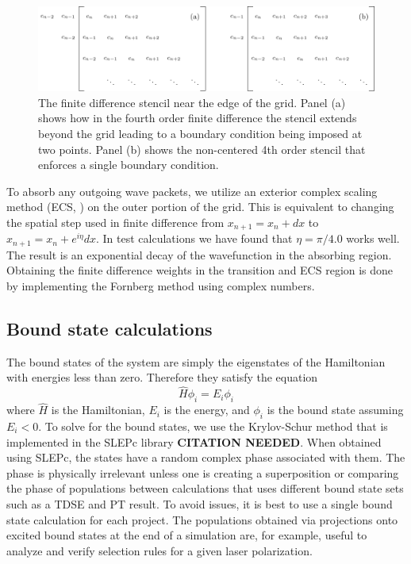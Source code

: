 \begin{figure}[t]
\centering
   
    \includegraphics[width=\linewidth]{figs/ghost_nodes.pdf}
   
\caption{The finite difference stencil near the edge of the grid. Panel (a) shows how in the fourth order finite difference the stencil extends beyond the grid leading to a boundary condition being imposed at two points. Panel (b) shows the non-centered 4th order stencil that enforces a single boundary condition.
} 
  \label{fig:ghost_nodes}
\end{figure}


To absorb any outgoing wave packets, we utilize an exterior complex scaling method (ECS, \cite{He2007}) on the outer portion of the grid. This is equivalent to changing the spatial step used in finite difference from $x_{n+1} = x_n+dx$ to $x_{n+1} = x_n+e^{i\eta}dx$. In test calculations we have found that $\eta=\pi / 4.0$ works well. The result is an exponential decay of the wavefunction in the absorbing region. Obtaining the finite difference weights in the transition and ECS region is done by implementing the Fornberg method \cite{Fornberg1988} using complex numbers.


\subsection{Bound state calculations} %
\label{sub:bound_state_calculations}
The bound states of the system are simply the eigenstates of the Hamiltonian with energies less than zero. Therefore they satisfy the equation 
\begin{equation}
    \hat{H} \phi_i = E_i \phi_i
\end{equation}
where $\hat{H}$ is the Hamiltonian, $E_i$ is the energy, and $\phi_i$ is the bound state assuming $E_i < 0$. To solve for the bound states, we use the Krylov-Schur method that is implemented in the SLEPc library \textbf{CITATION NEEDED}. When obtained using SLEPc, the states have a random complex phase associated with them. The phase is physically irrelevant unless one is creating a superposition or comparing the phase of populations between calculations that uses different bound state sets such as a TDSE and PT result. To avoid issues, it is best to use a single bound state calculation for each project. The populations obtained via projections onto excited bound states at the end of a simulation are, for example, useful to analyze and verify selection rules for a given laser polarization.

